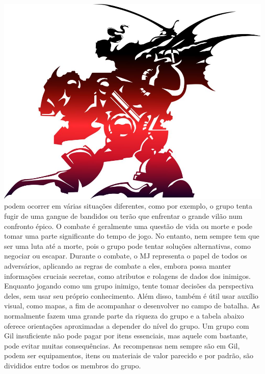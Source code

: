 %
%
\\\\
%
\includegraphics[width=\columnwidth]{./art/images/ff6.jpg}
%
\vfill
%
 podem ocorrer em várias situações diferentes, como por exemplo, o grupo tenta fugir de uma gangue de bandidos ou terão que enfrentar o grande vilão num confronto épico.
O combate é geralmente uma questão de vida ou morte e pode tomar uma parte significante do tempo de jogo. 
No entanto, nem sempre tem que ser uma luta até a morte, pois o grupo pode tentar soluções alternativas, como negociar ou escapar. 
Durante o combate, o MJ representa o papel de todos os adversários, aplicando as regras de combate a eles, embora possa manter informações cruciais secretas, como atributos e rolagens de dados dos inimigos.
Enquanto jogando como um grupo inimigo, tente tomar decisões da perspectiva deles, sem usar seu próprio conhecimento.
Além disso, também é útil usar auxílio visual, como mapas, a fim de acompanhar o desenvolver no campo de batalha.
As  normalmente fazem uma grande parte da riqueza do grupo e a tabela abaixo oferece orientações aproximadas a depender do nível do grupo.
Um grupo com Gil insuficiente não pode pagar por itens essenciais, mas aquele com bastante, pode evitar muitas consequências.
As recompensas nem sempre são em Gil, podem ser equipamentos, itens ou materiais de valor parecido e por padrão, são divididos entre todos os membros do grupo.
%
\vfill
%

